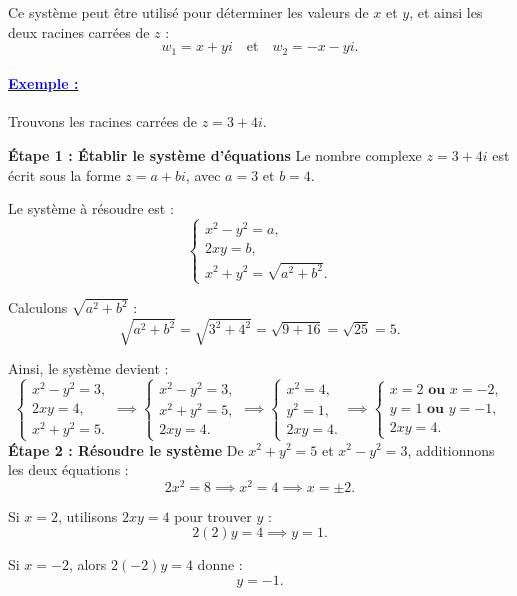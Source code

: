 \documentclass[12pt]{article}
\begin{document}
Ce système peut être utilisé pour déterminer les valeurs de \( x \) et \( y \), et ainsi les deux racines carrées de \( z \) :
\[
w_1 = x + yi \quad \text{et} \quad w_2 = -x - yi.
\]

\paragraph{\underline{\textbf{\textcolor{blue}{Exemple :}}}}

Trouvons les racines carrées de \( z = 3 + 4i \).

\textbf{Étape 1 : Établir le système d'équations}  
Le nombre complexe \( z = 3 + 4i \) est écrit sous la forme \( z = a + bi \), avec \( a = 3 \) et \( b = 4 \).  

Le système à résoudre est :
\[
\begin{cases}
x^2 - y^2 = a, \\
2xy = b, \\
x^2 + y^2 = \sqrt{a^2 + b^2}.
\end{cases}
\]

Calculons \( \sqrt{a^2 + b^2} \) :
\[
\sqrt{a^2 + b^2} = \sqrt{3^2 + 4^2} = \sqrt{9 + 16} = \sqrt{25} = 5.
\]

Ainsi, le système devient :
\[
\begin{cases}
x^2 - y^2 = 3, \\
2xy = 4, \\
x^2 + y^2 = 5.
\end{cases}\implies
\begin{cases}
x^2 - y^2 = 3, \\
x^2 + y^2 = 5,\\
2xy = 4.
\end{cases}\implies
\begin{cases}
x^2 = 4, \\
y^2 = 1,\\
2xy = 4.
\end{cases}\implies
\begin{cases}
x = 2 \textbf{ ou } x = -2, \\
y = 1 \textbf{ ou } y = -1,\\
2xy = 4.
\end{cases}
\]
\textbf{Étape 2 : Résoudre le système}  
De \( x^2 + y^2 = 5 \) et \( x^2 - y^2 = 3 \), additionnons les deux équations :
\[
2x^2 = 8 \implies x^2 = 4 \implies x = \pm 2.
\]

Si \( x = 2 \), utilisons \( 2xy = 4 \) pour trouver \( y \) :
\[
2(2)y = 4 \implies y = 1.
\]

Si \( x = -2 \), alors \( 2(-2)y = 4 \) donne :
\[
y = -1.
\]
\end{document}
